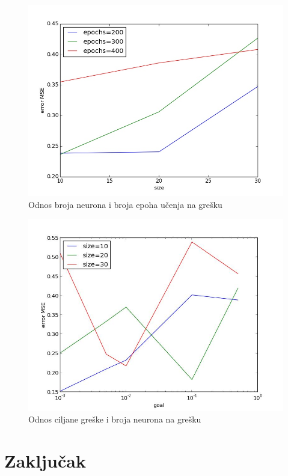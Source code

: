\documentclass[a4paper,twocolumn]{article}
\begin{document}
\begin{figure}[htc]
    \centering
    \includegraphics[scale=0.25]{goal.jpeg}
    \caption{Odnos broja neurona i broja epoha u\v{c}enja na gre\v{s}ku}
    \label{fig:greske}
\end{figure}

\begin{figure}[htc]
    \centering
    \includegraphics[scale=0.25]{size.jpeg}
    \caption{Odnos ciljane gre\v{s}ke i broja neurona na gre\v{s}ku}
    \label{fig:velicine}
\end{figure}

\section{Zaklju\v{c}ak}
\end{document}
